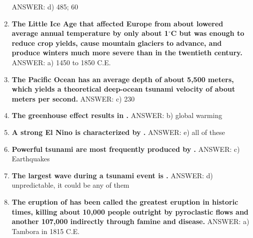 \documentclass[10pt]{article}
\newcommand{\Rivpt}{\rule{.1pt}{1pt}}
\begin{document}
\begin{enumerate}
{\begin{samepage}
{}
ANSWER: d)	485; 60
\end{samepage}
}
\item {
\setlength{\itemsep}{0cm}
\setlength{\parskip}{.2cm}
\begin{samepage}
\textbf{
The Little Ice Age that affected Europe from about \makebox[1cm]{\Rivpt\hrulefill\Rivpt} lowered average annual temperature by only about 1\ensuremath{^\circ}C but was enough to reduce crop yields, cause mountain glaciers to advance, and produce winters much more severe than in the twentieth century.
}
ANSWER: a) 1450 to 1850 C.E.
\end{samepage}
}
\item {
\setlength{\itemsep}{0cm}
\setlength{\parskip}{.2cm}
\begin{samepage}
\textbf{
The Pacific Ocean has an average depth of about 5,500 meters, which yields a theoretical deep-ocean tsunami velocity of about \makebox[1cm]{\Rivpt\hrulefill\Rivpt} meters per second.
}
ANSWER: c)	230
\end{samepage}
}
\item {
\setlength{\itemsep}{0cm}
\setlength{\parskip}{.2cm}
\begin{samepage}
\textbf{
The greenhouse effect results in \makebox[1cm]{\Rivpt\hrulefill\Rivpt}.
}
ANSWER: b) global warming
\end{samepage}
}
\item {
\setlength{\itemsep}{0cm}
\setlength{\parskip}{.2cm}
\begin{samepage}
\textbf{
A strong El Nino is characterized by \makebox[1cm]{\Rivpt\hrulefill\Rivpt}.
}
ANSWER: e) all of these
\end{samepage}
}
\item {
\setlength{\itemsep}{0cm}
\setlength{\parskip}{.2cm}
\begin{samepage}
\textbf{
Powerful tsunami are most frequently produced by \makebox[1cm]{\Rivpt\hrulefill\Rivpt}.
}
ANSWER: c)	Earthquakes
\end{samepage}
}
\item {
\setlength{\itemsep}{0cm}
\setlength{\parskip}{.2cm}
\begin{samepage}
\textbf{
The largest wave during a tsunami event is \makebox[1cm]{\Rivpt\hrulefill\Rivpt}.
}
ANSWER: d)	unpredictable, it could be any of them
\end{samepage}
}
\item {
\setlength{\itemsep}{0cm}
\setlength{\parskip}{.2cm}
\begin{samepage}
\textbf{
The eruption of \makebox[1cm]{\Rivpt\hrulefill\Rivpt} has been called the greatest eruption in historic times, killing about 10,000 people outright by pyroclastic flows and another 107,000 indirectly through famine and disease. 
}
ANSWER: a) Tambora in 1815 C.E.
\end{samepage}
}
\end{enumerate}
\end{document}
